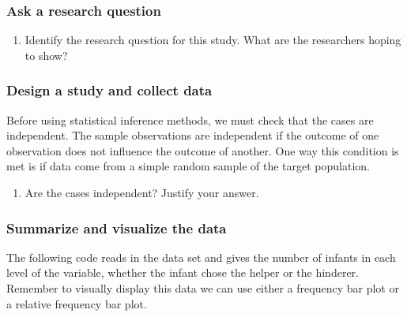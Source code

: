 \documentclass[
]{report}
\providecommand{\tightlist}{%
  \setlength{\itemsep}{0pt}\setlength{\parskip}{0pt}}
\begin{document}
\hypertarget{ask-a-research-question}{%
\subsubsection*{Ask a research question}\label{ask-a-research-question}}

\begin{enumerate}
\def\labelenumi{\arabic{enumi}.}
\tightlist
\item
  Identify the research question for this study. What are the researchers hoping to show?
\end{enumerate}

\vspace{0.6in}

\hypertarget{design-a-study-and-collect-data}{%
\subsubsection*{Design a study and collect data}\label{design-a-study-and-collect-data}}

Before using statistical inference methods, we must check that the cases are independent. The sample observations are independent if the outcome of one observation does not influence the outcome of another. One way this condition is met is if data come from a simple random sample of the target population.

\begin{enumerate}
\def\labelenumi{\arabic{enumi}.}
\setcounter{enumi}{1}
\tightlist
\item
  Are the cases independent? Justify your answer.
\end{enumerate}

\vspace{0.8in}

\hypertarget{summarize-and-visualize-the-data}{%
\subsubsection*{Summarize and visualize the data}\label{summarize-and-visualize-the-data}}

The following code reads in the data set and gives the number of infants in each level of the variable, whether the infant chose the helper or the hinderer. Remember to visually display this data we can use either a frequency bar plot or a relative frequency bar plot.
\end{document}
